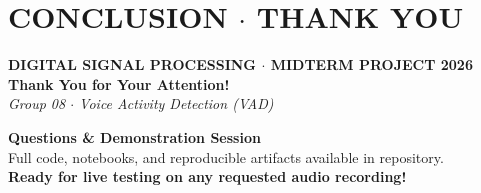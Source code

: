 \documentclass[aspectratio=169, 10pt]{beamer}
\begin{document}
\section{CONCLUSION $\cdot$ THANK YOU}
\begin{frame}[plain]
  \vspace{0.15cm}
  \begin{tcolorbox}[contentframe, width=0.96\textwidth, center]
  \begin{center}
    \vspace{0.3cm}
    {\fontsize{10pt}{12pt}\selectfont\color{cyanAccent}\textbf{DIGITAL SIGNAL PROCESSING $\cdot$ MIDTERM PROJECT 2026}} \\[8pt]
    {\fontsize{24pt}{28pt}\selectfont\color{textWhite}\textbf{Thank You for Your Attention!}} \\[6pt]
    {\fontsize{12pt}{15pt}\selectfont\color{cyanGlow}\textit{Group 08 $\cdot$ Voice Activity Detection (VAD)}} \\[14pt]

    \begin{tcolorbox}[glowcard, width=0.88\textwidth]
      \centering
      {\fontsize{9pt}{11pt}\selectfont\color{textWhite}
      \textbf{Questions \& Demonstration Session}\\[4pt]
      \color{textMuted}\fontsize{8pt}{10pt}\selectfont
      Full code, notebooks, and reproducible artifacts available in repository.\\[2pt]
      \color{mintGreen}\textbf{Ready for live testing on any requested audio recording!}}
    \end{tcolorbox}
  \end{center}
  \end{tcolorbox}
\end{frame}

\end{document}
